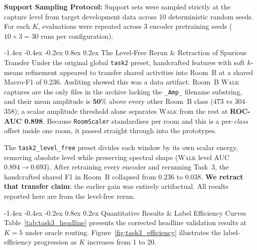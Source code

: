 \documentclass[10pt,a4paper]{article}
\makeatletter
\renewcommand{\subsection}{\@startsection{subsection}{2}{\z@}%
  {-1.4ex \@plus -0.4ex \@minus -0.2ex}%
  {0.8ex \@plus 0.2ex}%
  {\normalfont\normalsize\bfseries\color{secondary}}}
\makeatother
\begin{document}
\noindent\textbf{Support Sampling Protocol:} Support sets were sampled strictly at the capture level from target development data across 10 deterministic random seeds. For each $K$, evaluations were repeated across 3 encoder pretraining seeds ($10 \times 3 = 30$ runs per configuration).

\subsection{The Level-Free Rerun \& Retraction of Spurious Transfer}
Under the original global \texttt{task2} preset, handcrafted features with soft $k$-means refinement appeared to transfer shared activities into Room~B at a shared Macro-F1 of $\mathbf{0.236}$. Auditing showed this was a data artifact. Room~B \textsc{Walk} captures are the only files in the archive lacking the \texttt{\_Amp\_} filename substring, and their mean amplitude is $\mathbf{50\%}$ above every other Room~B class ($473$ vs $304$--$358$); a scalar amplitude threshold alone separates \textsc{Walk} from the rest at \textbf{ROC-AUC 0.898}. Because \texttt{RoomScaler} standardises per room and this is a per-\emph{class} offset inside one room, it passed straight through into the prototypes.

The \texttt{task2\_level\_free} preset divides each window by its own scalar energy, removing absolute level while preserving spectral shape (\textsc{Walk} level AUC $0.894 \to 0.693$). After retraining every encoder and rerunning Task~3, the handcrafted shared F1 in Room~B collapsed from $0.236$ to $\mathbf{0.038}$. \textbf{We retract that transfer claim}: the earlier gain was entirely artifactual. All results reported here are from the level-free rerun.

\subsection{Quantitative Results \& Label Efficiency Curves}
Table~\ref{tab:task3_headline} presents the corrected headline validation results at $K=5$ under oracle routing. Figure~\ref{fig:task3_efficiency} illustrates the label-efficiency progression as $K$ increases from 1 to 20.
\end{document}
